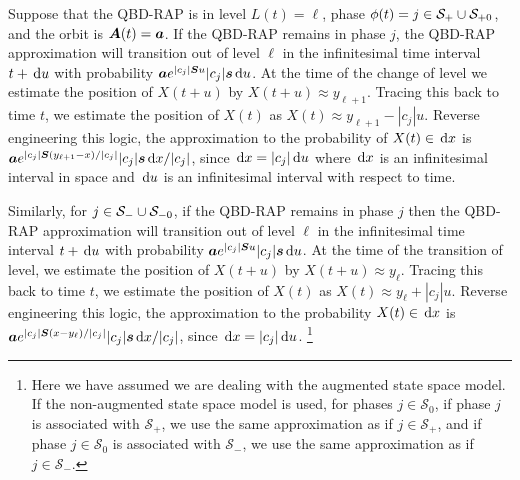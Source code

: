 Suppose that the QBD-RAP is in level \(L(t)=\ell\), phase \(\phi(t)=j\in\mathcal{S}_+\cup\mathcal{S}_{+0}\), and the orbit is \(\boldsymbol A(t)=\boldsymbol a\). If the QBD-RAP remains in phase \(j\), the QBD-RAP approximation will transition out of level \(\ell\) in the infinitesimal time interval \(t+\, \mathrm{d} u\) with probability \(\boldsymbol a e^{|c_j|\boldsymbol{S}u}|c_j|\boldsymbol s\, \mathrm{d} u\). At the time of the change of level we estimate the position of \(X(t+u)\) by \(X(t+u)\approx y_{\ell+1}\). Tracing this back to time \(t\), we estimate the position of \(X(t)\) as \(X(t)\approx y_{\ell+1} - |c_j|u\). Reverse engineering this logic, the approximation to the probability of \(X(t) \in\, \mathrm{d} x\) is \(\boldsymbol a e^{|c_j|\boldsymbol S(y_{\ell+1}-x)/|c_j|}|c_j|\boldsymbol s \, \mathrm{d} x/|c_j|\), since \(\, \mathrm{d} x = |c_j|\, \mathrm{d} u\) where \(\, \mathrm{d} x\) is an infinitesimal interval in space and \(\, \mathrm{d} u\) is an infinitesimal interval with respect to time.

Similarly, for \(j\in\mathcal S_-\cup\mathcal{S}_{-0}\), if the QBD-RAP remains in phase \(j\) then the QBD-RAP approximation will transition out of level \(\ell\) in the infinitesimal time interval \(t+\, \mathrm{d} u\) with probability \(\boldsymbol a e^{|c_j|\boldsymbol{S}u}|c_j|\boldsymbol s\, \mathrm{d} u\). At the time of the transition of level, we estimate the position of \(X(t+u)\) by \(X(t+u)\approx y_{\ell}\). Tracing this back to time \(t\), we estimate the position of \(X(t)\) as \(X(t)\approx y_{\ell} + |c_j|u\). Reverse engineering this logic, the approximation to the probability \(X(t) \in\, \mathrm{d} x\) is \(\boldsymbol a e^{|c_j|\boldsymbol S(x-y_{\ell})/|c_j|}|c_j|\boldsymbol s \, \mathrm{d} x/|c_j|\), since \(\, \mathrm{d} x = |c_j|\, \mathrm{d} u\). 
\footnote{Here we have assumed we are dealing with the augmented state space model. If the non-augmented state space model is used, for phases \(j\in\mathcal S_0\), if phase \(j\) is associated with \(\mathcal S_+\), we use the same approximation as if \(j\in{}\mathcal S_+\), and if phase \(j\in\mathcal S_0\) is associated with \(\mathcal S_-\), we use the same approximation as if \(j\in{}\mathcal S_-\).}

